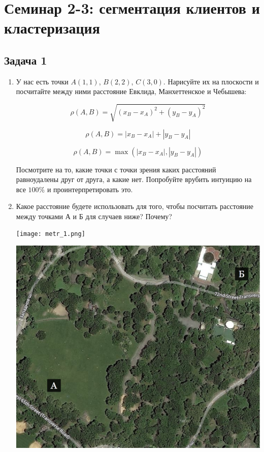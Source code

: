 \documentclass[12pt, a4paper, oneside]{article}
\begin{document}
\section*{Семинар 2-3:  сегментация клиентов и кластеризация}

\subsection*{Задача 1 }

\begin{enumerate}

\item У нас есть точки $A(1,1)$, $B(2,2)$, $C(3,0)$. Нарисуйте их на плоскости и посчитайте между ними расстояние Евклида, Манхеттенское и Чебышева: 

\[ \rho(A,B) = \sqrt{(x_B - x_A)^2 + (y_B - y_A)^2} \]

\[\rho(A,B) = |x_B - x_A| + |y_B - y_A|  \]

\[ \rho(A,B) = \max(|x_B - x_A|, |y_B - y_A|) \]

Посмотрите на то, какие точки с точки зрения каких расстояний равноудалены друг от друга, а какие нет. Попробуйте врубить интуицию на все $100\%$ и проинтерпретировать это. 

\item Какое расстояние будете использовать для того, чтобы посчитать расстояние между точками А и Б для случаев ниже? Почему? 

\begin{minipage}[t]{0.45\textwidth}
	\texttt{[image: metr\_1.png]}
\end{minipage}
\hfill
\begin{minipage}[t]{0.45\textwidth}
	\includegraphics[scale=0.12]{metr_2.png}
\end{minipage}


\end{enumerate}
\end{document}
